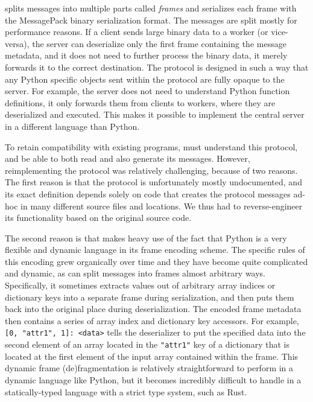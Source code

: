 \dask{} splits messages into multiple parts called \emph{frames}
and serializes each frame with the MessagePack binary serialization
format. The messages are split mostly for performance reasons. If a client sends large binary data
to a worker (or vice-versa), the server can deserialize only the first frame containing the message
metadata, and it does not need to further process the binary data, it merely forwards it to the
correct destination. The protocol is designed in such a way that any Python specific objects sent
within the protocol are fully opaque to the server. For example, the server does not need to
understand Python function definitions, it only forwards them from clients to workers, where they
are deserialized and executed. This makes it possible to implement the central server in a
different language than Python.

To retain compatibility with existing \dask{} programs,
\rsds{} must understand this protocol, and be able to both read and also
generate its messages. However, reimplementing the protocol was relatively challenging, because of
two reasons. The first reason is that the protocol is unfortunately mostly
undocumented, and its exact definition depends solely on
\dask{} code that creates the protocol messages ad-hoc in many different source
files and locations. We thus had to reverse-engineer its functionality based on the original
\dask{} source code.

The second reason is that \dask{} makes heavy use of the fact that Python is a
very flexible and dynamic language in its frame encoding scheme. The specific rules of this
encoding grew organically over time and they have become quite complicated and dynamic, as
\dask{} can split messages into frames almost arbitrary ways. Specifically, it
sometimes extracts values out of arbitrary array indices or dictionary keys into a separate frame
during serialization, and then puts them back into the original place during deserialization. The
encoded frame metadata then contains a series of array index and dictionary key accessors. For
example, \verb|[0, "attr1", 1]: <data>| tells the deserializer to put the specified data into the
second element of an array located in the \texttt{"attr1"} key of a dictionary that is
located at the first element of the input array contained within the frame. This dynamic frame
(de)fragmentation is relatively straightforward to perform in a dynamic language like Python, but
it becomes incredibly difficult to handle in a statically-typed language with a strict type system,
such as Rust.

